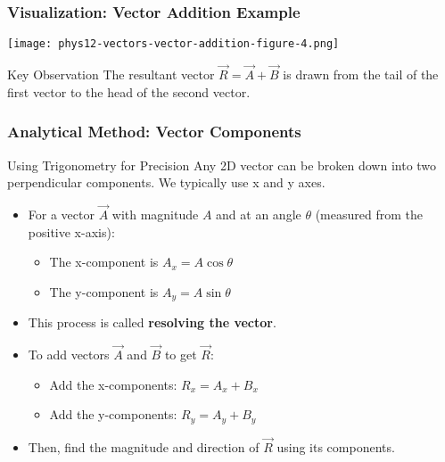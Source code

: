 \documentclass{beamer}
\begin{document}
\begin{frame}
\frametitle{Visualization: Vector Addition Example}
\begin{center}
\texttt{[image: phys12-vectors-vector-addition-figure-4.png]}
\end{center}
\begin{block}{Key Observation}
The resultant vector $\vec{R} = \vec{A} + \vec{B}$ is drawn from the tail of the first vector to the head of the second vector.
\end{block}
\end{frame}

\begin{frame}
\frametitle{Analytical Method: Vector Components}
\begin{block}{Using Trigonometry for Precision}
Any 2D vector can be broken down into two perpendicular components. We typically use x and y axes.
\end{block}
\begin{itemize}
    \item For a vector $\vec{A}$ with magnitude $A$ and at an angle $\theta$ (measured from the positive x-axis):
    \begin{itemize}
        \item The x-component is $A_x = A \cos \theta$
        \item The y-component is $A_y = A \sin \theta$
    \end{itemize}
    \item This process is called \textbf{resolving the vector}.
    \item To add vectors $\vec{A}$ and $\vec{B}$ to get $\vec{R}$:
    \begin{itemize}
        \item Add the x-components: $R_x = A_x + B_x$
        \item Add the y-components: $R_y = A_y + B_y$
    \end{itemize}
    \item Then, find the magnitude and direction of $\vec{R}$ using its components.
\end{itemize}
\end{frame}
\end{document}
